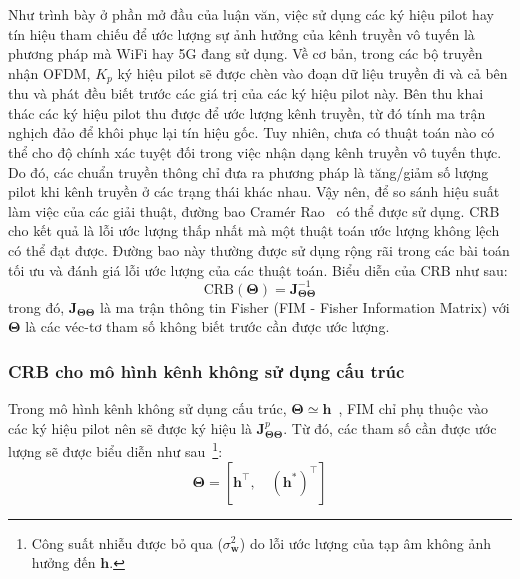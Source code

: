 Như trình bày ở phần mở đầu của luận văn, việc sử dụng các ký hiệu pilot hay tín hiệu tham chiếu để ước lượng sự ảnh hưởng của kênh truyền vô tuyến là phương pháp mà WiFi hay 5G đang sử dụng. Về cơ bản, trong các bộ truyền nhận OFDM, $K_p$ ký hiệu pilot sẽ được chèn vào đoạn dữ liệu truyền đi và cả bên thu và phát đều biết trước các giá trị của các ký hiệu pilot này. Bên thu khai thác các ký hiệu pilot thu được để ước lượng kênh truyền, từ đó tính ma trận nghịch đảo để khôi phục lại tín hiệu gốc. Tuy nhiên, chưa có thuật toán nào có thể cho độ chính xác tuyệt đối trong việc nhận dạng kênh truyền vô tuyến thực. Do đó, các chuẩn truyền thông chỉ đưa ra phương pháp là tăng/giảm số lượng pilot khi kênh truyền ở các trạng thái khác nhau. Vậy nên, để so sánh hiệu suất làm việc của các giải thuật, đường bao Cramér Rao~\cite{Kay1993} có thể được sử dụng. 
CRB cho kết quả là lỗi ước lượng thấp nhất mà một thuật toán ước lượng không lệch có thể đạt được. Đường bao này thường được sử dụng rộng rãi trong các bài toán tối ưu và đánh giá lỗi ước lượng của các thuật toán.
Biểu diễn của CRB như sau:
\begin{equation}
    \text{CRB}(\boldsymbol{\Theta}) = \mathbf{J}_{\boldsymbol{\Theta}\boldsymbol{\Theta}}^{-1}
\end{equation}
trong đó, $\mathbf{J}_{\boldsymbol{\Theta}\boldsymbol{\Theta}}$ là ma trận thông tin Fisher (FIM - Fisher Information Matrix) với $\boldsymbol{\Theta}$ là các véc-tơ tham số không biết trước cần được ước lượng.

\subsubsection*{\textbf{CRB cho mô hình kênh không sử dụng cấu trúc}}
Trong mô hình kênh không sử dụng cấu trúc, $\boldsymbol{\Theta} \simeq	 \mathbf{h}$~\cite{Ladaycia2017}, FIM chỉ phụ thuộc vào các ký hiệu pilot nên sẽ được ký hiệu là $\mathbf{J}_{\boldsymbol{\Theta}\boldsymbol{\Theta}}^p$. Từ đó, các tham số cần được ước lượng sẽ được biểu diễn như sau~\cite{Menni2012}\footnote{Công suất nhiễu được bỏ qua ($\sigma^2_{\mathbf{w}}$) do lỗi ước lượng của tạp âm không ảnh hưởng đến $\mathbf{h}$.}:
\begin{equation}
    \boldsymbol{\Theta}=\left[\mathbf{h}^{\top},  \quad  \left(\mathbf{h}^{*}\right)^{\top}\right]
\end{equation}

